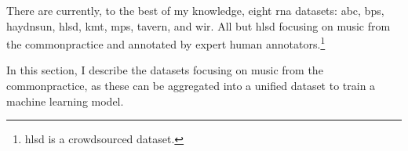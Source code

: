 
There are currently, to the best of my knowledge, eight
\gls{rna} datasets: \gls{abc}, \gls{bps}, \gls{haydnsun},
\gls{hlsd}, \gls{kmt}, \gls{mps}, \gls{tavern}, and
\gls{wir}. All but \gls{hlsd} focusing on music from the
\gls{commonpractice} and annotated by expert human
annotators.\footnote{\gls{hlsd} is a crowdsourced dataset.}

In this section, I describe the datasets focusing on music
from the \gls{commonpractice}, as these can be aggregated
into a unified dataset to train a machine learning model.
